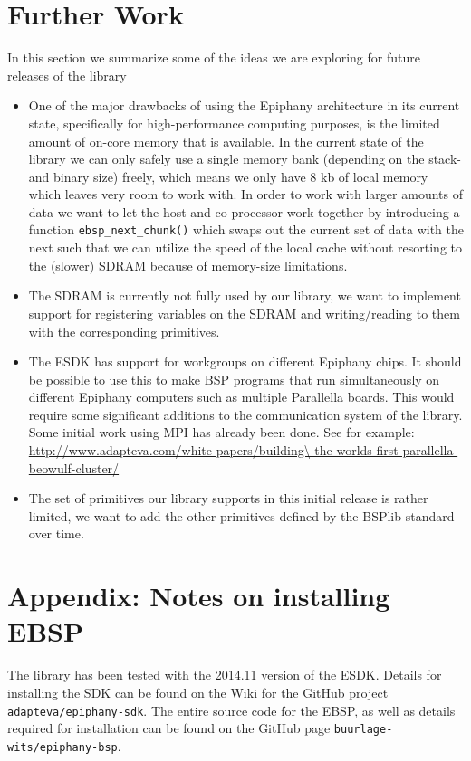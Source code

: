 \documentclass[fleqn]{article}
\renewcommand{\(}{\left(}
\renewcommand{\)}{\right)}
\begin{document}
\section{Further Work}

In this section we summarize some of the ideas we are exploring for future releases of the library

\begin{itemize}
\item One of the major drawbacks of using the Epiphany architecture in its current state, specifically for high-performance computing purposes, is the limited amount of on-core memory that is available. In the current state of the library we can only safely use a single memory bank (depending on the stack- and binary size) freely, which means we only have 8 kb of local memory which leaves very room to work with. In order to work with larger amounts of data we want to let the host and co-processor work together by introducing a function \verb.ebsp_next_chunk(). which swaps out the current set of data with the next such that we can utilize the speed of the local cache without resorting to the (slower) SDRAM because of memory-size limitations.
\item The SDRAM is currently not fully used by our library, we want to implement support for registering variables on the SDRAM and writing/reading to them with the corresponding primitives.
\item The ESDK has support for workgroups on different Epiphany chips. It should be possible to use this to make BSP programs that run simultaneously on different Epiphany computers such as multiple Parallella boards. This would require some significant additions to the communication system of the library. Some initial work using MPI has already been done. See for example: \url{http://www.adapteva.com/white-papers/building\-the-worlds-first-parallella-beowulf-cluster/}
\item The set of primitives our library supports in this initial release is rather limited, we want to add the other primitives defined by the BSPlib standard over time.
\end{itemize}

\section*{Appendix: Notes on installing EBSP}

The library has been tested with the 2014.11 version of the ESDK. Details for installing the SDK can be found on the Wiki for the GitHub project \verb.adapteva/epiphany-sdk.. The entire source code for the EBSP, as well as details required for installation can be found on the GitHub page \verb.buurlage-wits/epiphany-bsp..
\end{document}
